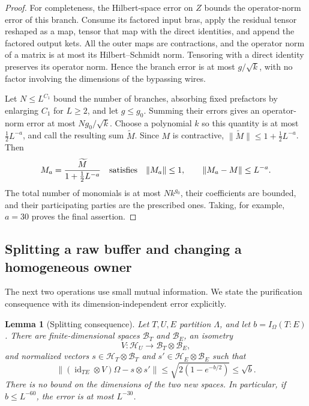 \documentclass[11pt]{article}
\numberwithin{equation}{section}
\newtheorem{lemma}[theorem]{Lemma}
\theoremstyle{definition}
\theoremstyle{remark}
\DeclareMathOperator{\id}{id}
\newcommand{\norm}[1]{\lVert #1\rVert}
\begin{document}
\begin{proof}
For completeness, the Hilbert-space error on $Z$ bounds the operator-norm
error of this branch.  Consume its factored input bras, apply the residual
tensor reshaped as a map, tensor that map with the direct identities, and
append the factored output kets.  All the outer maps are contractions,
and the operator norm of a matrix is at most its Hilbert--Schmidt norm.
Tensoring with a direct identity preserves its operator norm.  Hence the
branch error is at most $g/\sqrt{k}$, with no factor involving the dimensions
of the bypassing wires.

Let $N\le L^{C_1}$ bound the number of branches, absorbing fixed prefactors
by enlarging $C_1$ for $L\ge2$, and let $g\le g_0$.  Summing their errors
gives an operator-norm error at most $Ng_0/\sqrt{k}$.  Choose a polynomial
$k$ so this quantity is at most $\tfrac12L^{-a}$, and call the resulting
sum $\widetilde M$.  Since $M$ is contractive,
$\norm{\widetilde M}\le1+\tfrac12L^{-a}$.  Then
\[
 M_a=\frac{\widetilde M}{1+\tfrac12L^{-a}}
 \quad\hbox{satisfies}\quad
 \norm{M_a}\le1,\qquad \norm{M_a-M}\le L^{-a}.
\]
The total number of monomials is at most $Nk^{g_0}$, their coefficients are
bounded, and their participating parties are the prescribed ones.  Taking,
for example, $a=30$ proves the final assertion.
\end{proof}

\subsection{Splitting a raw buffer and changing a homogeneous owner}

The next two operations use small mutual information.  We state the
purification consequence with its dimension-independent error explicitly.

\begin{lemma}[Splitting consequence]\label{lem:splitting}
Let $T,U,E$ partition $\Lambda$, and let
$b=I_\Omega(T:E)$.  There are finite-dimensional spaces $\mathcal B_T$ and
$\mathcal B_E$, an isometry
\[
 V:\mathcal H_U\longrightarrow\mathcal B_T\otimes\mathcal B_E,
\]
and normalized vectors
$s\in\mathcal H_T\otimes\mathcal B_T$ and
$s'\in\mathcal H_E\otimes\mathcal B_E$ such that
\begin{equation}\label{eq:frame-splitting}
 \norm{(\id_{TE}\otimes V)\Omega-s\otimes s'}
       \le\sqrt{2(1-e^{-b/2})}\le\sqrt b.
\end{equation}
There is no bound on the dimensions of the two new spaces.  In particular,
if $b\le L^{-60}$, the error is at most $L^{-30}$.
\end{lemma}
\end{document}
